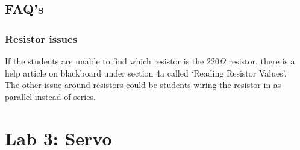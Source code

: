 \documentclass[11pt,a4paper]{article}
\begin{document}
\vspace{1em}

\subsection*{FAQ's}
\subsubsection*{Resistor issues}
If the students are unable to find which resistor is the $220\Omega$ resistor, there is a help article on blackboard under section 4a called `Reading Resistor Values'.\\
\noindent
The other issue around resistors could be students wiring the resistor in as parallel instead of series.


\section*{Lab 3: Servo}
\end{document}
